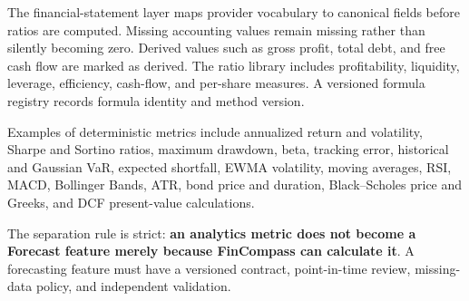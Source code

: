 \documentclass[11pt]{article}
\begin{document}
The financial-statement layer maps provider vocabulary to canonical fields before ratios are computed. Missing accounting values remain missing rather than silently becoming zero. Derived values such as gross profit, total debt, and free cash flow are marked as derived. The ratio library includes profitability, liquidity, leverage, efficiency, cash-flow, and per-share measures. A versioned formula registry records formula identity and method version.

Examples of deterministic metrics include annualized return and volatility, Sharpe and Sortino ratios, maximum drawdown, beta, tracking error, historical and Gaussian VaR, expected shortfall, EWMA volatility, moving averages, RSI, MACD, Bollinger Bands, ATR, bond price and duration, Black--Scholes price and Greeks, and DCF present-value calculations.

The separation rule is strict: \textbf{an analytics metric does not become a Forecast feature merely because FinCompass can calculate it}. A forecasting feature must have a versioned contract, point-in-time review, missing-data policy, and independent validation.



\end{document}
